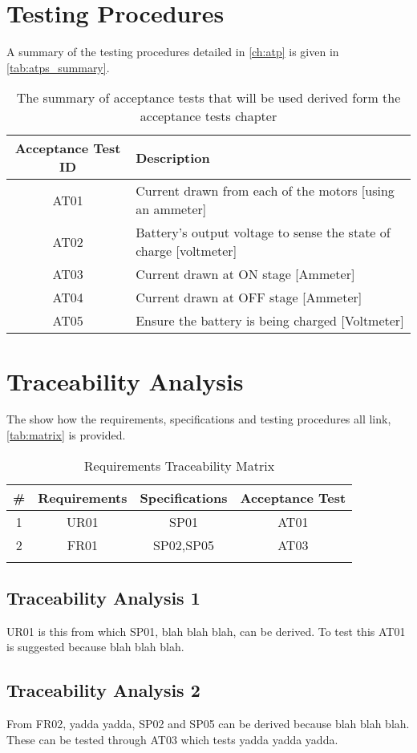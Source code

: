 \documentclass[class=report,11pt,crop=false]{standalone}
\begin{document}
\section{Testing Procedures}
A summary of the testing procedures detailed in \autoref{ch:atp} is given in \autoref{tab:atps_summary}.
\begin{table}[h]
    \centering
    \caption{ The summary of acceptance tests that will be used derived form the acceptance tests chapter}
    \label{tab:atps_summary}
    \begin{tabular}{|c|m{10cm}|}
        \hline
        \textbf{Acceptance Test ID} & \textbf{Description} \\
        \hline
         AT01 & Current drawn from each of the motors [using an ammeter]\\
         \hline
         AT02 & Battery's  output voltage to sense the state of charge [voltmeter]\\
         \hline
         AT03 & Current drawn at ON stage [Ammeter]\\
         \hline
         AT04 & Current drawn at OFF stage [Ammeter]\\
         \hline
         AT05 & Ensure the battery is being charged [Voltmeter]\\
         \hline
    \end{tabular}
\end{table}

\section{Traceability Analysis}
The show how the requirements, specifications and testing procedures all link, \autoref{tab:matrix} is provided.

\begin{table}[h]
    \centering
    \caption{Requirements Traceability Matrix}
    \label{tab:matrix}
    \begin{tabular}{|c|c|c|c|}
        \hline
        \# & Requirements & Specifications  & Acceptance Test\\
        \hline
         1 & UR01 &  SP01 & AT01 \\
         2 & FR01 & SP02,SP05 & AT03 \\
         & &  & \\
    \hline
    \end{tabular}
\end{table}

\subsection{Traceability Analysis 1}
UR01 is this from which SP01, blah blah blah, can be derived. To test this AT01 is suggested because blah blah blah.

\subsection{Traceability Analysis 2}
From FR02, yadda yadda, SP02 and SP05 can be derived because blah blah blah. These can be tested through AT03 which tests yadda yadda yadda.


\ifstandalone

\fi
\end{document}
